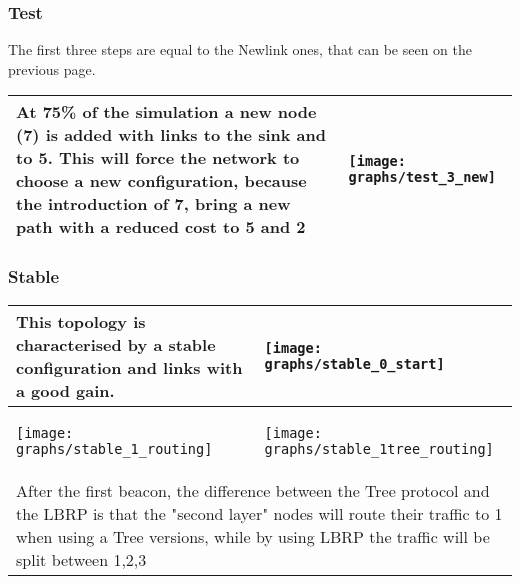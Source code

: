 \documentclass{article}
\begin{document}
\subsubsection{Test}
	The first three steps are equal to the Newlink ones, that can be seen on the previous page.
	\begin{table}[H]
		\centering
		\begin{tabular}{*{2}{m{}}}
			\hline
			\small At 75\% of the simulation a new node (7) is added with links to the sink and to 5. This will force the network to choose a new configuration, because the introduction of 7, bring a new path with a reduced cost to 5 and 2&\begin{center}\texttt{[image: graphs/test\_3\_new]}\end{center}\\
			\hline
		\end{tabular}
		\label{tab:testIndepthP1}
	\end{table}
\subsubsection{Stable}
	\begin{table}[H]
		\centering
		\begin{tabular}{*{2}{m{}}}
			\hline
			\small This topology is characterised by a stable configuration and links with a good gain. &\begin{center}\texttt{[image: graphs/stable\_0\_start]}\end{center}\\
			\hline
			\begin{center}\texttt{[image: graphs/stable\_1\_routing]}\end{center}&\begin{center}\texttt{[image: graphs/stable\_1tree\_routing]}\end{center}\\
			\multicolumn{2}{p{12cm}}{\small After the first beacon, the difference between the Tree protocol and the LBRP is that the "second layer" nodes will route their traffic to 1 when using a Tree versions, while by using LBRP the traffic will be split between 1,2,3}\\
			\hline
		\end{tabular}
		\label{tab:stableIndepth}
	\end{table}
\clearpage






\end{document}
